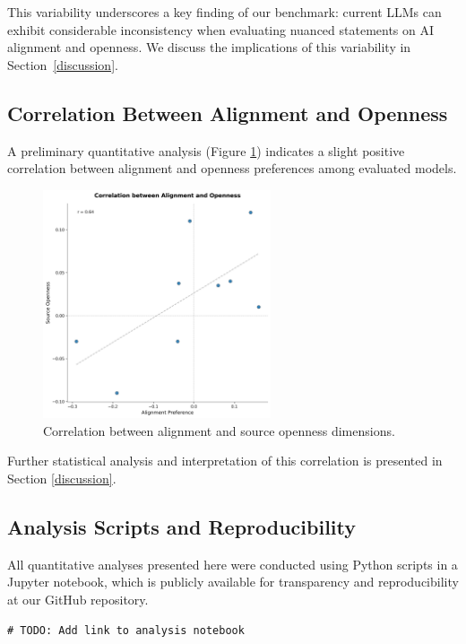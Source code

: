 This variability underscores a key finding of our benchmark: current LLMs can exhibit considerable inconsistency when evaluating nuanced statements on AI alignment and openness. We discuss the implications of this variability in Section~\ref{discussion}.


\subsection{Correlation Between Alignment and Openness}
A preliminary quantitative analysis (Figure \ref{fig:correlation}) indicates a slight positive correlation between alignment and openness preferences among evaluated models.

\begin{figure}[htbp]
    \centering
    \includegraphics[width=0.6\textwidth]{figures/alignment_openness_correlation.png}
    \caption{Correlation between alignment and source openness dimensions.}
    \label{fig:correlation}
\end{figure}

Further statistical analysis and interpretation of this correlation is presented in Section \ref{discussion}.

\subsection{Analysis Scripts and Reproducibility}
All quantitative analyses presented here were conducted using Python scripts in a Jupyter notebook, which is publicly available for transparency and reproducibility at our GitHub repository.

\begin{verbatim}
# TODO: Add link to analysis notebook
\end{verbatim}